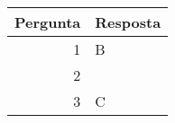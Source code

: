 \setcounter{chapter}{16}
\begin{center}
\begin{tabular}{r | l}
	Pergunta & Resposta \\ \hline
	1 & B \\
	2 & \\
	3 & C
\end{tabular}
\end{center}
